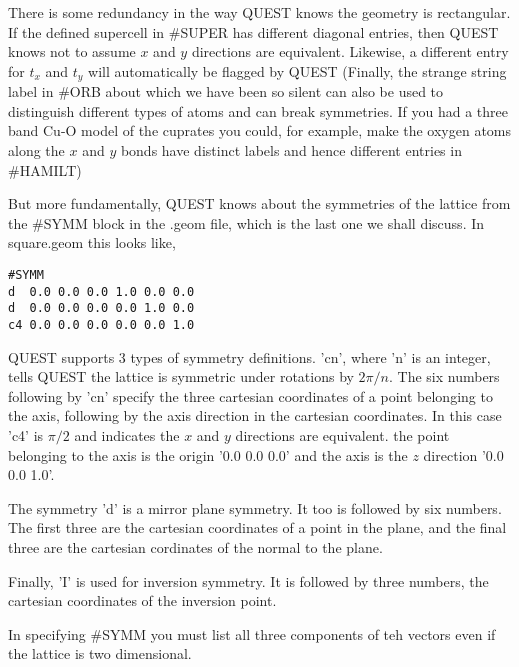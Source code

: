 \documentclass[12pt]{article}
\begin{document}
There is some redundancy in the way QUEST knows the geometry is rectangular. If the defined supercell in \#SUPER has different diagonal entries, then QUEST knows not to assume $x$ and $y$ directions are equivalent. Likewise, a different entry for $t_x$ and $t_y$ will automatically be flagged by QUEST (Finally, the strange string label in \#ORB about which we have been so silent can also be used to distinguish different types of atoms and can break symmetries. If you had a three band Cu-O model of the cuprates you could, for example, make the oxygen atoms along the $x$ and $y$ bonds have distinct labels and hence different entries in \#HAMILT)

But more fundamentally, QUEST knows about the symmetries of the lattice from the \#SYMM block in the .geom file, which is the last one we shall discuss. In square.geom this looks like,
\begin{verbatim}
#SYMM
d  0.0 0.0 0.0 1.0 0.0 0.0
d  0.0 0.0 0.0 0.0 1.0 0.0
c4 0.0 0.0 0.0 0.0 0.0 1.0
\end{verbatim}
QUEST supports 3 types of symmetry definitions. 'cn', where 'n' is an integer, tells QUEST the lattice is symmetric under rotations by $2 \pi / n$. The six numbers following by 'cn' specify the three cartesian coordinates of a point belonging to the axis, following by the axis direction in the cartesian coordinates. In this case 'c4' is $\pi / 2$ and indicates the $x$ and $y$ directions are equivalent. the point belonging to the axis is the origin '0.0 0.0 0.0' and the axis is the $z$ direction '0.0 0.0 1.0'.

The symmetry 'd' is a mirror plane symmetry. It too is followed by six numbers. The first three are the cartesian coordinates of a point in the plane, and the final three are the cartesian cordinates of the normal to the plane.

Finally, 'I' is used for inversion symmetry. It is followed by three numbers, the cartesian coordinates of the inversion point.

In specifying \#SYMM you must list all three components of teh vectors even if the lattice is two dimensional.


\end{document}
